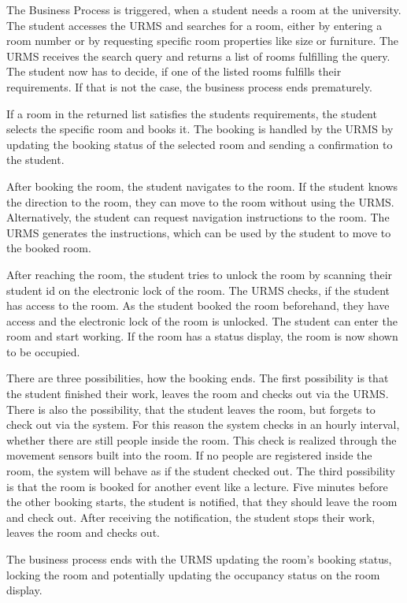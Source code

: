 \documentclass[article,onecolumn]{IEEEtran}
\begin{document}
The Business Process is triggered, when a student needs a room at the university.
The student accesses the URMS and searches for a room, either by entering a room number or by requesting specific room properties like size or furniture.
The URMS receives the search query and returns a list of rooms fulfilling the query.
The student now has to decide, if one of the listed rooms fulfills their requirements. If that is not the case, the business process ends prematurely.

If a room in the returned list satisfies the students requirements, the student selects the specific room and books it.
The booking is handled by the URMS by updating the booking status of the selected room and sending a confirmation to the student.

After booking the room, the student navigates to the room.
If the student knows the direction to the room, they can move to the room without using the URMS.
Alternatively, the student can request navigation instructions to the room. The URMS generates the instructions, which can be used by the student to move to the booked room.

After reaching the room, the student tries to unlock the room by scanning their student id on the electronic lock of the room.
The URMS checks, if the student has access to the room. As the student booked the room beforehand, they have access and the electronic lock of the room is unlocked.
The student can enter the room and start working.
If the room has a status display, the room is now shown to be occupied.

There are three possibilities, how the booking ends.
The first possibility is that the student finished their work, leaves the room and checks out via the URMS.
There is also the possibility, that the student leaves the room, but forgets to check out via the system. For this reason the system checks in an hourly interval, whether there are still people inside the room. This check is realized through the movement sensors built into the room. If no people are registered inside the room, the system will behave as if the student checked out.
The third possibility is that the room is booked for another event like a lecture.
Five minutes before the other booking starts, the student is notified, that they should leave the room and check out. After receiving the notification, the student stops their work, leaves the room and checks out.

The business process ends with the URMS updating the room's booking status, locking the room and potentially updating the occupancy status on the room display.
\end{document}
